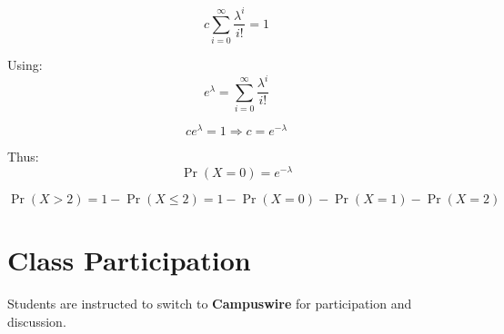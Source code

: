 \documentclass[11pt]{article}
\begin{document}
\[
c \sum_{i=0}^{\infty} \frac{\lambda^i}{i!} = 1
\]

Using:
\[
e^{\lambda} = \sum_{i=0}^{\infty} \frac{\lambda^i}{i!}
\]

\[
c e^{\lambda} = 1 \Rightarrow c = e^{-\lambda}
\]

Thus:
\[
\Pr(X=0) = e^{-\lambda}
\]

\[
\Pr(X>2) = 1 - \Pr(X \le 2)
= 1 - \Pr(X=0) - \Pr(X=1) - \Pr(X=2)
\]

\section{Class Participation}

Students are instructed to switch to \textbf{Campuswire} for participation and discussion.
\end{document}
